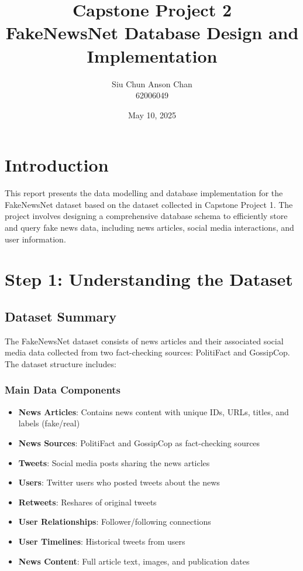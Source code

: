 \documentclass[12pt,a4paper]{report}
\title{Capstone Project 2\\
\large FakeNewsNet Database Design and Implementation}
\author{Siu Chun Anson Chan\\62006049}
\date{May 10, 2025}
\begin{document}
\maketitle

\tableofcontents

\chapter{Introduction}

This report presents the data modelling and database implementation for the FakeNewsNet dataset based on the dataset collected in Capstone Project 1. The project involves designing a comprehensive database schema to efficiently store and query fake news data, including news articles, social media interactions, and user information.

\chapter{Step 1: Understanding the Dataset}

\section{Dataset Summary}

The FakeNewsNet dataset consists of news articles and their associated social media data collected from two fact-checking sources: PolitiFact and GossipCop. The dataset structure includes:

\subsection{Main Data Components}
\begin{itemize}
    \item \textbf{News Articles}: Contains news content with unique IDs, URLs, titles, and labels (fake/real)
    \item \textbf{News Sources}: PolitiFact and GossipCop as fact-checking sources
    \item \textbf{Tweets}: Social media posts sharing the news articles
    \item \textbf{Users}: Twitter users who posted tweets about the news
    \item \textbf{Retweets}: Reshares of original tweets
    \item \textbf{User Relationships}: Follower/following connections
    \item \textbf{User Timelines}: Historical tweets from users
    \item \textbf{News Content}: Full article text, images, and publication dates
\end{itemize}
\end{document}
